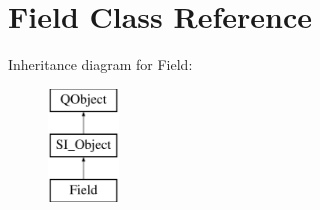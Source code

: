 \hypertarget{class_field}{}\section{Field Class Reference}
\label{class_field}
Inheritance diagram for Field\+:\begin{figure}[H]
\begin{center}
\leavevmode
\includegraphics[height=3.000000cm]{class_field}
\end{center}
\end{figure}
